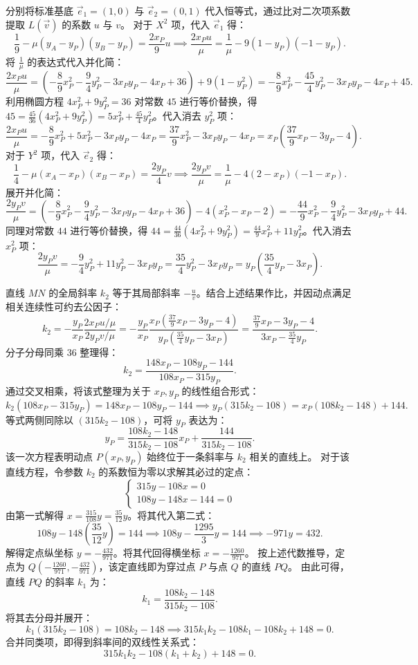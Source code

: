 \begin{solution}
分别将标准基底 $\vec{e}_1 = (1,0)$ 与 $\vec{e}_2 = (0,1)$ 代入恒等式，通过比对二次项系数提取 $L(\vec{v})$ 的系数 $u$ 与 $v$。
对于 $X^2$ 项，代入 $\vec{e}_1$ 得：
\[ \frac{1}{9} - \mu(y_A - y_P)(y_B - y_P) = \frac{2x_P}{9} u \implies \frac{2x_P u}{\mu} = \frac{1}{\mu} - 9(1 - y_P)(-1 - y_P). \]
将 $\frac{1}{\mu}$ 的表达式代入并化简：
\[ \frac{2x_P u}{\mu} = \left(-\frac{8}{9}x_P^2 - \frac{9}{4}y_P^2 - 3x_P y_P - 4x_P + 36\right) + 9(1 - y_P^2) = -\frac{8}{9}x_P^2 - \frac{45}{4}y_P^2 - 3x_P y_P - 4x_P + 45. \]
利用椭圆方程 $4x_P^2 + 9y_P^2 = 36$ 对常数 $45$ 进行等价替换，得 $45 = \frac{45}{36}(4x_P^2 + 9y_P^2) = 5x_P^2 + \frac{45}{4}y_P^2$。代入消去 $y_P^2$ 项：
\[ \frac{2x_P u}{\mu} = -\frac{8}{9}x_P^2 + 5x_P^2 - 3x_P y_P - 4x_P = \frac{37}{9}x_P^2 - 3x_P y_P - 4x_P = x_P\left(\frac{37}{9}x_P - 3y_P - 4\right). \]
对于 $Y^2$ 项，代入 $\vec{e}_2$ 得：
\[ \frac{1}{4} - \mu(x_A - x_P)(x_B - x_P) = \frac{2y_P}{4} v \implies \frac{2y_P v}{\mu} = \frac{1}{\mu} - 4(2 - x_P)(-1 - x_P). \]
展开并化简：
\[ \frac{2y_P v}{\mu} = \left(-\frac{8}{9}x_P^2 - \frac{9}{4}y_P^2 - 3x_P y_P - 4x_P + 36\right) - 4(x_P^2 - x_P - 2) = -\frac{44}{9}x_P^2 - \frac{9}{4}y_P^2 - 3x_P y_P + 44. \]
同理对常数 $44$ 进行等价替换，得 $44 = \frac{44}{36}(4x_P^2 + 9y_P^2) = \frac{44}{9}x_P^2 + 11y_P^2$。代入消去 $x_P^2$ 项：
\[ \frac{2y_P v}{\mu} = -\frac{9}{4}y_P^2 + 11y_P^2 - 3x_P y_P = \frac{35}{4}y_P^2 - 3x_P y_P = y_P\left(\frac{35}{4}y_P - 3x_P\right). \]

直线 $MN$ 的全局斜率 $k_2$ 等于其局部斜率 $-\frac{u}{v}$。结合上述结果作比，并因动点满足相关连续性可约去公因子：
\[ k_2 = -\frac{y_P}{x_P} \frac{2x_P u / \mu}{2y_P v / \mu} = -\frac{y_P}{x_P} \frac{x_P\left(\frac{37}{9}x_P - 3y_P - 4\right)}{y_P\left(\frac{35}{4}y_P - 3x_P\right)} = \frac{\frac{37}{9}x_P - 3y_P - 4}{3x_P - \frac{35}{4}y_P}. \]
分子分母同乘 $36$ 整理得：
\[ k_2 = \frac{148x_P - 108y_P - 144}{108x_P - 315y_P}. \]
通过交叉相乘，将该式整理为关于 $x_P, y_P$ 的线性组合形式：
\[ k_2(108x_P - 315y_P) = 148x_P - 108y_P - 144 \implies y_P(315k_2 - 108) = x_P(108k_2 - 148) + 144. \]
等式两侧同除以 $(315k_2 - 108)$，可将 $y_P$ 表达为：
\[ y_P = \frac{108k_2 - 148}{315k_2 - 108} x_P + \frac{144}{315k_2 - 108}. \]
该一次方程表明动点 $P(x_P, y_P)$ 始终位于一条斜率与 $k_2$ 相关的直线上。
对于该直线方程，令参数 $k_2$ 的系数恒为零以求解其必过的定点：
\[ \begin{cases} 315y - 108x = 0 \\ 108y - 148x - 144 = 0 \end{cases} \]
由第一式解得 $x = \frac{315}{108}y = \frac{35}{12}y$。将其代入第二式：
\[ 108y - 148\left(\frac{35}{12}y\right) = 144 \implies 108y - \frac{1295}{3}y = 144 \implies -971y = 432. \]
解得定点纵坐标 $y = -\frac{432}{971}$。将其代回得横坐标 $x = -\frac{1260}{971}$。
按上述代数推导，定点为 $Q\left(-\frac{1260}{971}, -\frac{432}{971}\right)$，该定直线即为穿过点 $P$ 与点 $Q$ 的直线 $PQ$。
由此可得，直线 $PQ$ 的斜率 $k_1$ 为：
\[ k_1 = \frac{108k_2 - 148}{315k_2 - 108}. \]
将其去分母并展开：
\[ k_1(315k_2 - 108) = 108k_2 - 148 \implies 315k_1 k_2 - 108k_1 - 108k_2 + 148 = 0. \]
合并同类项，即得到斜率间的双线性关系式：
\[ 315k_1 k_2 - 108(k_1 + k_2) + 148 = 0. \]

\end{solution}


